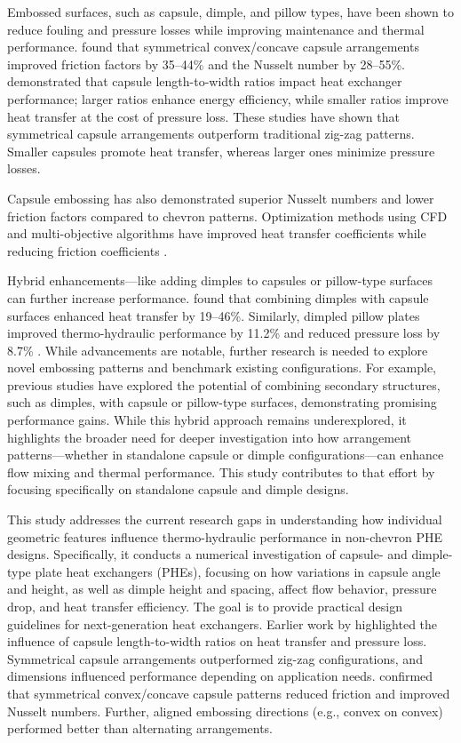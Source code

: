 \documentclass[review,12pt]{elsarticle}
\begin{document}
Embossed surfaces, such as capsule, dimple, and pillow types, have been shown to reduce fouling and pressure losses while improving maintenance and thermal performance. \citet{hamedi2024} found that symmetrical convex/concave capsule arrangements improved friction factors by 35--44\% and the Nusselt number by 28--55\%. \citet{jiang2019a} demonstrated that capsule length-to-width ratios impact heat exchanger performance; larger ratios enhance energy efficiency, while smaller ratios improve heat transfer at the cost of pressure loss. These studies have shown that symmetrical capsule arrangements outperform traditional zig-zag patterns. Smaller capsules promote heat transfer, whereas larger ones minimize pressure losses.

Capsule embossing has also demonstrated superior Nusselt numbers and lower friction factors compared to chevron patterns. Optimization methods using CFD and multi-objective algorithms have improved heat transfer coefficients while reducing friction coefficients \citep{yu2024}.

Hybrid enhancements---like adding dimples to capsules or pillow-type surfaces can further increase performance. \citet{shao2024} found that combining dimples with capsule surfaces enhanced heat transfer by 19--46\%. Similarly, dimpled pillow plates improved thermo-hydraulic performance by 11.2\% and reduced pressure loss by 8.7\% \citep{piper2019}. While advancements are notable, further research is needed to explore novel embossing patterns and benchmark existing configurations. For example, previous studies have explored the potential of combining secondary structures, such as dimples, with capsule or pillow-type surfaces, demonstrating promising performance gains. While this hybrid approach remains underexplored, it highlights the broader need for deeper investigation into how arrangement patterns---whether in standalone capsule or dimple configurations---can enhance flow mixing and thermal performance. This study contributes to that effort by focusing specifically on standalone capsule and dimple designs.

This study addresses the current research gaps in understanding how individual geometric features influence thermo-hydraulic performance in non-chevron PHE designs. Specifically, it conducts a numerical investigation of capsule- and dimple-type plate heat exchangers (PHEs), focusing on how variations in capsule angle and height, as well as dimple height and spacing, affect flow behavior, pressure drop, and heat transfer efficiency. The goal is to provide practical design guidelines for next-generation heat exchangers. Earlier work by \citet{jiang2019} highlighted the influence of capsule length-to-width ratios on heat transfer and pressure loss. Symmetrical capsule arrangements outperformed zig-zag configurations, and dimensions influenced performance depending on application needs. \citet{hamedi2024} confirmed that symmetrical convex/concave capsule patterns reduced friction and improved Nusselt numbers. Further, aligned embossing directions (e.g., convex on convex) performed better than alternating arrangements.
\end{document}
